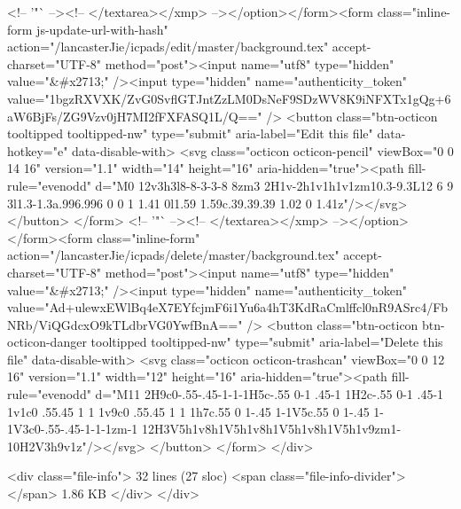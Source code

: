           <!-- '"` --><!-- </textarea></xmp> --></option></form><form class="inline-form js-update-url-with-hash" action="/lancasterJie/icpads/edit/master/background.tex" accept-charset="UTF-8" method="post"><input name="utf8" type="hidden" value="&#x2713;" /><input type="hidden" name="authenticity_token" value="1bgzRXVXK/ZvG0SvflGTJntZzLM0DsNeF9SDzWV8K9iNFXTx1gQg+6aW6BjFs/ZG9Vzv0jH7MI2fFXFASQ1L/Q==" />
            <button class="btn-octicon tooltipped tooltipped-nw" type="submit"
              aria-label="Edit this file" data-hotkey="e" data-disable-with>
              <svg class="octicon octicon-pencil" viewBox="0 0 14 16" version="1.1" width="14" height="16" aria-hidden="true"><path fill-rule="evenodd" d="M0 12v3h3l8-8-3-3-8 8zm3 2H1v-2h1v1h1v1zm10.3-9.3L12 6 9 3l1.3-1.3a.996.996 0 0 1 1.41 0l1.59 1.59c.39.39.39 1.02 0 1.41z"/></svg>
            </button>
</form>
        <!-- '"` --><!-- </textarea></xmp> --></option></form><form class="inline-form" action="/lancasterJie/icpads/delete/master/background.tex" accept-charset="UTF-8" method="post"><input name="utf8" type="hidden" value="&#x2713;" /><input type="hidden" name="authenticity_token" value="Ad+ulewxEWlBq4eX7EYfcjmF6i1Yu6a4hT3KdRaCmlffcl0nR9ASrc4/FbNRb/ViQGdcxO9kTLdbrVG0YwfBnA==" />
          <button class="btn-octicon btn-octicon-danger tooltipped tooltipped-nw" type="submit"
            aria-label="Delete this file" data-disable-with>
            <svg class="octicon octicon-trashcan" viewBox="0 0 12 16" version="1.1" width="12" height="16" aria-hidden="true"><path fill-rule="evenodd" d="M11 2H9c0-.55-.45-1-1-1H5c-.55 0-1 .45-1 1H2c-.55 0-1 .45-1 1v1c0 .55.45 1 1 1v9c0 .55.45 1 1 1h7c.55 0 1-.45 1-1V5c.55 0 1-.45 1-1V3c0-.55-.45-1-1-1zm-1 12H3V5h1v8h1V5h1v8h1V5h1v8h1V5h1v9zm1-10H2V3h9v1z"/></svg>
          </button>
</form>  </div>

  <div class="file-info">
      32 lines (27 sloc)
      <span class="file-info-divider"></span>
    1.86 KB
  </div>
</div>

    


